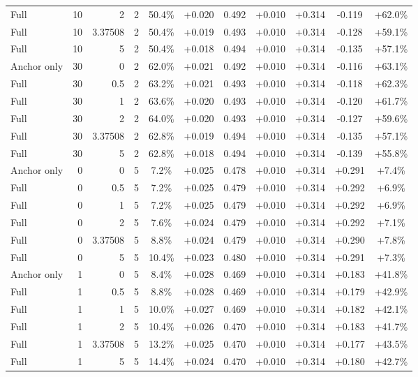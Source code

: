 \begin{table}[htbp]
\begin{tabular}{lrrrccccccc}
Full & 10 & 2 & 2 & 50.4\% & +0.020 & 0.492 & +0.010 & +0.314 & -0.119 & +62.0\% \\
Full & 10 & 3.37508 & 2 & 50.4\% & +0.019 & 0.493 & +0.010 & +0.314 & -0.128 & +59.1\% \\
Full & 10 & 5 & 2 & 50.4\% & +0.018 & 0.494 & +0.010 & +0.314 & -0.135 & +57.1\% \\
Anchor only & 30 & 0 & 2 & 62.0\% & +0.021 & 0.492 & +0.010 & +0.314 & -0.116 & +63.1\% \\
Full & 30 & 0.5 & 2 & 63.2\% & +0.021 & 0.493 & +0.010 & +0.314 & -0.118 & +62.3\% \\
Full & 30 & 1 & 2 & 63.6\% & +0.020 & 0.493 & +0.010 & +0.314 & -0.120 & +61.7\% \\
Full & 30 & 2 & 2 & 64.0\% & +0.020 & 0.493 & +0.010 & +0.314 & -0.127 & +59.6\% \\
Full & 30 & 3.37508 & 2 & 62.8\% & +0.019 & 0.494 & +0.010 & +0.314 & -0.135 & +57.1\% \\
Full & 30 & 5 & 2 & 62.8\% & +0.018 & 0.494 & +0.010 & +0.314 & -0.139 & +55.8\% \\
Anchor only & 0 & 0 & 5 & 7.2\% & +0.025 & 0.478 & +0.010 & +0.314 & +0.291 & +7.4\% \\
Full & 0 & 0.5 & 5 & 7.2\% & +0.025 & 0.479 & +0.010 & +0.314 & +0.292 & +6.9\% \\
Full & 0 & 1 & 5 & 7.2\% & +0.025 & 0.479 & +0.010 & +0.314 & +0.292 & +6.9\% \\
Full & 0 & 2 & 5 & 7.6\% & +0.024 & 0.479 & +0.010 & +0.314 & +0.292 & +7.1\% \\
Full & 0 & 3.37508 & 5 & 8.8\% & +0.024 & 0.479 & +0.010 & +0.314 & +0.290 & +7.8\% \\
Full & 0 & 5 & 5 & 10.4\% & +0.023 & 0.480 & +0.010 & +0.314 & +0.291 & +7.3\% \\
Anchor only & 1 & 0 & 5 & 8.4\% & +0.028 & 0.469 & +0.010 & +0.314 & +0.183 & +41.8\% \\
Full & 1 & 0.5 & 5 & 8.8\% & +0.028 & 0.469 & +0.010 & +0.314 & +0.179 & +42.9\% \\
Full & 1 & 1 & 5 & 10.0\% & +0.027 & 0.469 & +0.010 & +0.314 & +0.182 & +42.1\% \\
Full & 1 & 2 & 5 & 10.4\% & +0.026 & 0.470 & +0.010 & +0.314 & +0.183 & +41.7\% \\
Full & 1 & 3.37508 & 5 & 13.2\% & +0.025 & 0.470 & +0.010 & +0.314 & +0.177 & +43.5\% \\
Full & 1 & 5 & 5 & 14.4\% & +0.024 & 0.470 & +0.010 & +0.314 & +0.180 & +42.7\% \\

\end{tabular}
\end{table}
